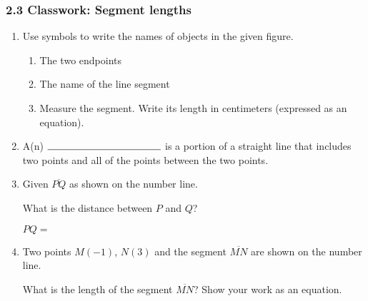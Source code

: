 \documentclass[12pt, twoside]{article}
\begin{document}
\subsubsection*{2.3 Classwork: Segment lengths}
\begin{enumerate}[itemsep=0.5cm]
\item Use symbols to write the names of objects in the given figure.
\begin{multicols}{2}
   \par
\columnbreak
\begin{enumerate}[itemsep=1cm]
  \item The two endpoints
  \item The name of the line segment
  \item Measure the segment. Write its length in centimeters (expressed as an equation).
\end{enumerate}
\end{multicols} \vspace{0.25cm}

\item A(n) $\rule{4cm}{0.15mm}$ is a portion of a straight line that includes two points and all of the points between the two points.

\item Given $\overline{PQ}$ as shown on the number line. \par \smallskip
   \par \smallskip
  What is the distance between $P$ and $Q$? \par \smallskip
    $PQ=$ \vspace{1cm}
  
\item Two points $M(-1)$, $N(3)$ and the segment $\overline{MN}$ are shown on the number line. \par \smallskip
{} \par \smallskip
What is the length of the segment $\overline{MN}$? Show your work as an equation. \vspace{2cm}


\end{enumerate}
\end{document}
